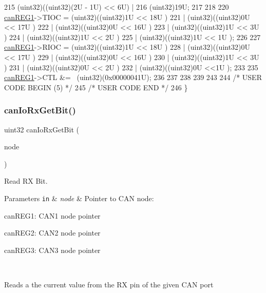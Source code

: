 \begin{DoxyCode}
215                    (uint32)((uint32)(2U - 1U) << 6U) |
216                    (uint32)19U;
217 
218 
220     \mbox{\hyperlink{reg__can_8h_a7a0d043070590fc91cfa3c0e39379b19}{canREG1}}->TIOC =  (uint32)((uint32)1U  << 18U )
221                    | (uint32)((uint32)0U  << 17U )
222                    | (uint32)((uint32)0U  << 16U )                
223                    | (uint32)((uint32)1U  << 3U )  
224                    | (uint32)((uint32)1U  << 2U )    
225                    | (uint32)((uint32)1U << 1U );
226                    
227     \mbox{\hyperlink{reg__can_8h_a7a0d043070590fc91cfa3c0e39379b19}{canREG1}}->RIOC =  (uint32)((uint32)1U  << 18U )    
228                    | (uint32)((uint32)0U  << 17U )  
229                    | (uint32)((uint32)0U  << 16U )   
230                    | (uint32)((uint32)1U  << 3U )  
231                    | (uint32)((uint32)0U  << 2U )
232                    | (uint32)((uint32)0U <<1U );        
233 
235     \mbox{\hyperlink{reg__can_8h_a7a0d043070590fc91cfa3c0e39379b19}{canREG1}}->CTL &= ~(uint32)(0x00000041U);
236 
237 
238 
239 
243 
244 \textcolor{comment}{/* USER CODE BEGIN (5) */}
245 \textcolor{comment}{/* USER CODE END */}
246 \}
\end{DoxyCode}
\mbox{\label{group__CAN_ga47e373a708ae421d26dc96f62d150492}} 
\subsubsection{\texorpdfstring{can\+Io\+Rx\+Get\+Bit()}{canIoRxGetBit()}}
{\footnotesize\ttfamily uint32 can\+Io\+Rx\+Get\+Bit (\begin{DoxyParamCaption}\item[{\mbox{\hyperlink{reg__can_8h_a54ace0879c28a425474845a63d662c05}{can\+B\+A\+S\+E\+\_\+t}} $\ast$}]{node }\end{DoxyParamCaption})}



Read RX Bit. 


\begin{DoxyParams}[1]{Parameters}
\mbox{\tt in}  & {\em node} & Pointer to C\+AN node\+:
\begin{DoxyItemize}
\item can\+R\+E\+G1\+: C\+A\+N1 node pointer
\item can\+R\+E\+G2\+: C\+A\+N2 node pointer
\item can\+R\+E\+G3\+: C\+A\+N3 node pointer
\end{DoxyItemize}\\
\hline
\end{DoxyParams}
Reads a the current value from the RX pin of the given C\+AN port 

